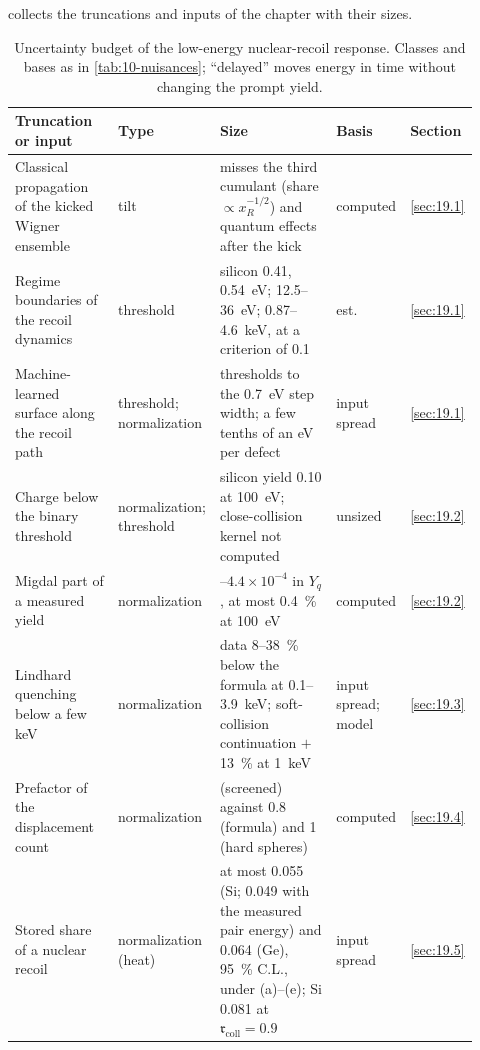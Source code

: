  collects the truncations and inputs of the chapter with their sizes.
\begin{table}[tbp]
  \caption{Uncertainty budget of the low-energy nuclear-recoil response. Classes and bases as in \cref{tab:10-nuisances}; ``delayed'' moves energy in time without changing the prompt yield.}
  \label{tab:19-nuisances}
  \centering\scriptsize\setlength{\tabcolsep}{3pt}
  \begin{tabular}{@{}>{\raggedright\arraybackslash}p{0.26\linewidth}>{\raggedright\arraybackslash}p{0.12\linewidth}>{\raggedright\arraybackslash}p{0.35\linewidth}>{\raggedright\arraybackslash}p{0.09\linewidth}>{\raggedright\arraybackslash}p{0.10\linewidth}@{}}
    \toprule
    Truncation or input & Type & Size & Basis & Section \\
    \midrule
    Classical propagation of the kicked Wigner ensemble & tilt & misses the third cumulant (share $\propto x_R^{-1/2}$) and quantum effects after the kick & computed & \cref{sec:19.1} \\
    Regime boundaries of the recoil dynamics & threshold & silicon 0.41, \SI{0.54}{eV}; 12.5--\SI{36}{eV}; 0.87--\SI{4.6}{keV}, at a criterion of 0.1 & est. & \cref{sec:19.1} \\
    Machine-learned surface along the recoil path & threshold; normali\-zation & thresholds to the \SI{0.7}{eV} step width; a few tenths of an eV per defect & input spread & \cref{sec:19.1} \\
    Charge below the binary threshold & normali\-zation; threshold & silicon yield 0.10 at \SI{100}{eV}; close-collision kernel not computed & unsized & \cref{sec:19.2} \\
    Migdal part of a measured yield & normali\-zation & 2.3--$4.4\times10^{-4}$ in $Y_q$, at most \SI{0.4}{\percent} at \SI{100}{eV} & computed & \cref{sec:19.2} \\
    Lindhard quenching below a few keV & normali\-zation & data 8--\SI{38}{\percent} below the formula at 0.1--\SI{3.9}{keV}; soft-collision continuation $+$\SI{13}{\percent} at \SI{1}{keV} & input spread; model & \cref{sec:19.3} \\
    Prefactor of the displacement count & normali\-zation & 0.70 (screened) against 0.8 (formula) and 1 (hard spheres) & computed & \cref{sec:19.4} \\
    Stored share of a nuclear recoil & normali\-zation (heat) & at most 0.055 (Si; 0.049 with the measured pair energy) and 0.064 (Ge), \SI{95}{\percent} C.L., under (a)--(e); Si 0.081 at $\mathfrak{r}_{\mathrm{coll}} = 0.9$ & input spread & \cref{sec:19.5} \\

\end{tabular}
\end{table}
